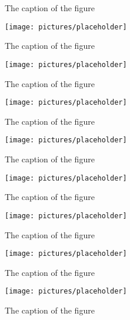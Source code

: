 \documentclass[12pt, oneside]{report}
\begin{document}
\begin{figure}[h]
  \centering
  
  \caption{The caption of the figure}
  \label{fig:BlockDiagram3}
\end{figure}

\begin{figure}[h]
  \centering
  \texttt{[image: pictures/placeholder]}
  \caption{The caption of the figure}
  \label{fig:BlockDiagram4}
\end{figure}

\begin{figure}[h]
  \centering
  \texttt{[image: pictures/placeholder]}
  \caption{The caption of the figure}
  \label{fig:BlockDiagram4}
\end{figure}

\begin{figure}[h]
  \centering
  \texttt{[image: pictures/placeholder]}
  \caption{The caption of the figure}
  \label{fig:BlockDiagram4}
\end{figure}

\begin{figure}[h]
  \centering
  \texttt{[image: pictures/placeholder]}
  \caption{The caption of the figure}
  \label{fig:BlockDiagram4}
\end{figure}

\begin{figure}[h]
  \centering
  \texttt{[image: pictures/placeholder]}
  \caption{The caption of the figure}
  \label{fig:BlockDiagram4}
\end{figure}

\begin{figure}[h]
  \centering
  \texttt{[image: pictures/placeholder]}
  \caption{The caption of the figure}
  \label{fig:BlockDiagram4}
\end{figure}

\begin{figure}[h]
  \centering
  \texttt{[image: pictures/placeholder]}
  \caption{The caption of the figure}
  \label{fig:BlockDiagram4}
\end{figure}

\begin{figure}[h]
  \centering
  \texttt{[image: pictures/placeholder]}
  \caption{The caption of the figure}
  \label{fig:BlockDiagram4}
\end{figure}
\end{document}
